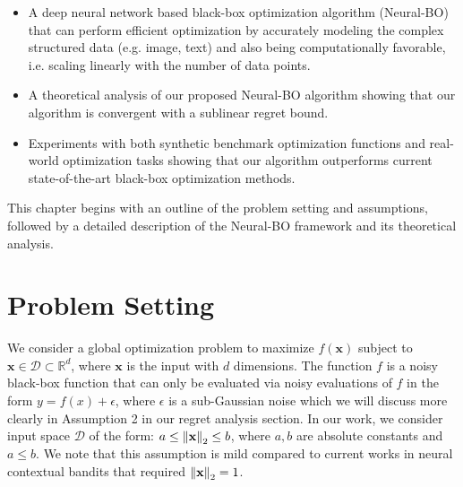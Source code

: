 \begin{itemize}
    \item A deep neural network based black-box optimization algorithm (Neural-BO) that can perform efficient optimization by accurately modeling the complex structured data (e.g. image, text) and also being computationally favorable, i.e. scaling linearly with the number of data points.
    \item A theoretical analysis of our proposed Neural-BO algorithm showing that our algorithm is convergent with a sublinear regret bound. 
    \item Experiments with both synthetic benchmark optimization functions and real-world optimization tasks showing that our algorithm outperforms current state-of-the-art black-box optimization methods.
\end{itemize} 

This chapter begins with an outline of the problem setting and assumptions, followed by a detailed description of the Neural-BO framework and its theoretical analysis. 


\section{Problem Setting}
\label{section:neural-bo_problem_setting}
We consider a global optimization problem to maximize $f(\mathbf{x})$ subject to $\mathbf{x} \in \mathcal D \subset \mathbb{R}^d$, where $\mathbf{x}$ is the input with $d$ dimensions. The function $f$ is a noisy black-box function that can only be evaluated via noisy evaluations of $f$ in the form  $y= f(x) + \epsilon$, where $\epsilon$ is a sub-Gaussian noise which we will discuss more clearly in Assumption 2 in our regret analysis section. In our work, we consider input space $\mathcal D$ of the form: $a \leq \norm{\mathbf{x}}_2 \leq  b$,  where $a, b$ are absolute constants and $a \le b$. We note that this assumption is mild compared to current works in neural contextual bandits \citep{zhou2020neural,zhang2021neural,xu2020neural,kassraie2022neural} that required $\norm{\mathbf{x}}_2 = 1$.  


